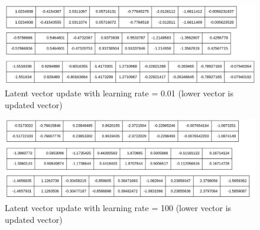 \documentclass{article}
\begin{document}
\begin{figure}[h]
	\centering
	\includegraphics[scale=0.3]{figures/lo001.png}
	\caption{Latent vector update with learning rate = 0.01 (lower vector is updated vector)}
	\label{fig:lo001}
\end{figure}

\begin{figure}[h]
	\centering
	\includegraphics[scale=0.3]{figures/lo100.png}
	\caption{Latent vector update with learning rate = 100 (lower vector is updated vector)}
	\label{fig:lo100}
\end{figure}

\printbibliography

\end{document}
